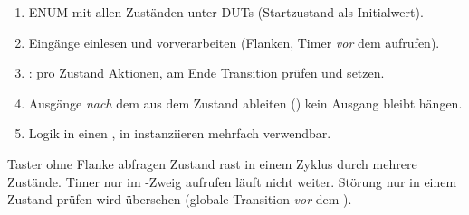\begin{rezept}
\label{rez:automat}
\begin{enumerate}
\item ENUM mit allen Zuständen unter DUTs (Startzustand als Initialwert).
\item Eingänge einlesen und vorverarbeiten (Flanken, Timer \emph{vor} dem
   aufrufen).
\item {}: pro Zustand Aktionen, am Ende Transition prüfen
  und  setzen.
\item Ausgänge \emph{nach} dem  aus dem Zustand ableiten
  () \ra kein Ausgang bleibt hängen.
\item Logik in einen , in  instanziieren
  \ra mehrfach verwendbar.
\end{enumerate}
\end{rezept}
\begin{falle}
Taster ohne Flanke abfragen \ra Zustand rast in einem Zyklus durch
mehrere Zustände. Timer nur im -Zweig aufrufen \ra läuft nicht
weiter. Störung nur in einem Zustand prüfen \ra wird übersehen (globale
Transition \emph{vor} dem ).
\end{falle}


